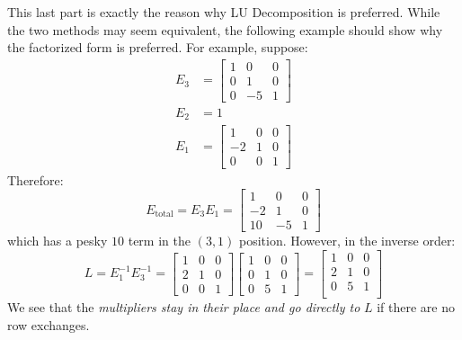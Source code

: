 \documentclass{article}
\begin{document}
 \begin{idea}
    This last part is exactly the reason why LU Decomposition is preferred. While the two methods may seem equivalent, the following example should show why the factorized form is preferred.  For example, suppose:
    \begin{align}
        E_3 &= \begin{bmatrix}
            1 & 0 & 0\\ 0 & 1 & 0 \\ 0 & - 5 & 1
        \end{bmatrix} \\ 
        E_2 &= 1 \\ 
        E_1 &= \begin{bmatrix}
            1 & 0 &0 \\ -2 & 1 & 0 \\ 0 & 0 & 1
        \end{bmatrix}
    \end{align}
    Therefore:
    \begin{equation}
        E_\text{total}=E_3E_1 = \begin{bmatrix}
            1 & 0 & 0\\ -2 & 1 & 0 \\ 10 & -5 & 1
        \end{bmatrix}
        \label{eq:}
    \end{equation}
    which has a pesky $10$ term in the $(3,1)$ position. However, in the inverse order:
    \begin{equation}
        L=E_1^{-1}E_3^{-1}=\begin{bmatrix}
            1 & 0 & 0\\ 2 & 1 & 0 \\ 0 & 0 & 1
        \end{bmatrix}
        \begin{bmatrix}
            1 & 0 & 0 \\ 0 & 1 & 0 \\ 0 & 5 & 1
        \end{bmatrix}
        =
        \begin{bmatrix}
            1 & 0 & 0 \\ 
            2 & 1 & 0 \\ 
            0 & 5 & 1 \\ 
        \end{bmatrix}
        \label{eq:}
    \end{equation}        
    We see that the \textit{multipliers stay in their place and go directly to} $L$ if there are no row exchanges.
\end{idea}
\end{document}
